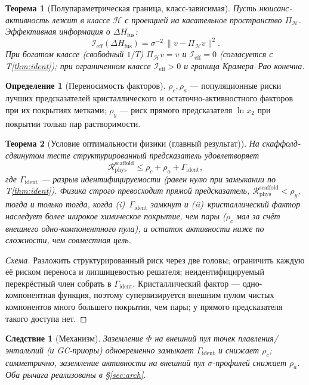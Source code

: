 \documentclass[11pt]{article}
\theoremstyle{plain}
\newtheorem{theorem}{Теорема}
\newtheorem{corollary}{Следствие}
\theoremstyle{definition}
\newtheorem{definition}{Определение}
\newcommand{\lnx}{\ln x_2}
\newcommand{\dHfus}{\Delta H_{\mathrm{fus}}}
\begin{document}
\begin{theorem}[Полупараметрическая граница, класс-зависимая]\label{thm:semi}
Пусть нюисанс-активность лежит в классе $\mathcal H$ с проекцией на касательное
пространство $\Pi_{\mathcal H}$. Эффективная информация о $\dHfus$:
\[ \mathcal I_{\text{eff}}(\dHfus)=\sigma^{-2}\,\big\|v-\Pi_{\mathcal H}v\big\|^2. \]
При богатом классе (свободный $1/T$) $\Pi_{\mathcal H}v=v$ и
$\mathcal I_{\text{eff}}=0$ (согласуется с T\ref{thm:ident}); при ограниченном
классе $\mathcal I_{\text{eff}}>0$ и граница Крамера--Рао конечна.
\end{theorem}

\begin{definition}[Переносимость факторов]
$\rho_c,\rho_a$ --- популяционные риски лучших предсказателей кристаллического и
остаточно-активностного факторов при их покрытиях метками; $\rho_y$ --- риск
прямого предсказателя $\lnx$ при покрытии только пар растворимости.
\end{definition}

\begin{theorem}[Условие оптимальности физики (главный результат)]\label{thm:cond}
На скаффолд-сдвинутом тесте структурированный предсказатель удовлетворяет
\[ \mathcal R_{\text{phys}}^{\text{scaffold}}\le
   \rho_c+\rho_a+\Gamma_{\text{ident}}, \]
где $\Gamma_{\text{ident}}$ --- разрыв идентифицируемости (равен нулю при
замыкании по T\ref{thm:ident}). Физика строго превосходит прямой предсказатель,
$\mathcal R_{\text{phys}}^{\text{scaffold}}<\rho_y$, \emph{тогда и только тогда},
когда (i)~$\Gamma_{\text{ident}}$ замкнут и (ii)~кристаллический фактор наследует
более широкое химическое покрытие, чем пары ($\rho_c$ мал за счёт внешнего
одно-компонентного пула), а остаток активности ниже по сложности, чем совместная
цель.
\end{theorem}
\begin{proof}[Схема]
Разложить структурированный риск через две головы; ограничить каждую её риском
переноса и липшицевостью решателя; неидентифицируемый перекрёстный член собрать в
$\Gamma_{\text{ident}}$. Кристаллический фактор --- одно-компонентная функция,
поэтому супервизируется внешним пулом чистых компонентов много большего покрытия,
чем пары; у прямого предсказателя такого доступа нет.
\end{proof}

\begin{corollary}[Механизм]
Заземление $\Phi$ на внешний пул точек плавления/энтальпий (и GC-приоры)
одновременно замыкает $\Gamma_{\text{ident}}$ и снижает $\rho_c$; симметрично,
заземление активности на внешний пул $\sigma$-профилей снижает $\rho_a$. Оба
рычага реализованы в \S\ref{sec:arch}.
\end{corollary}
\end{document}
